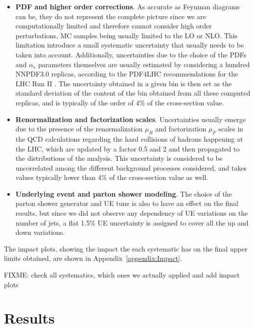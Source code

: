 \documentclass[a4paper, 10pt, openright]{report}
\begin{document}
\begin{itemize}
\item \textbf{PDF and higher order corrections}. As accurate as Feynman diagrams can be, they do not represent the complete picture since we are computationally limited and therefore cannot consider high order perturbations, \ac{MC} samples being usually limited to the \acf{LO} or \acf{NLO}. This limitation introduce a small systematic uncertainty that usually needs to be taken into account. Additionally, uncertainties due to the choice of the \acp{PDF} and $\alpha_s$ parameters themselves are usually estimated by considering a hundred NNPDF3.0 \cite{NNPDF} replicas, according to the PDF4LHC recommendations for the \ac{LHC} Run II \cite{PDF4LHC}. The uncertainty obtained in a given bin is then set as the standard deviation of the content of the bin obtained from all these computed replicas, and is typically of the order of 4\% of the cross-section value.
\item \textbf{Renormalization and factorization scales}. Uncertainties usually emerge due to the presence of the renormalization $\mu_R$ and factorization $\mu_F$ scales in the QCD calculations regarding the hard collisions of hadrons happening at the \ac{LHC}, which are updated by a factor 0.5 and 2 and then propagated to the distributions of the analysis. This uncertainty is considered to be uncorrelated among the different background processes considered, and takes values typically lower than 4\% of the cross-section value as well.
\item \textbf{Underlying event and parton shower modeling}. The choice of the parton shower generator and \ac{UE} tune is also to have an effect on the final results, but since we did not observe any dependency of \ac{UE} variations on the number of jets, a flat 1.5\% \ac{UE} uncertainty is assigned to cover all the up and down variations.
\end{itemize}

The impact plots, showing the impact the each systematic has on the final upper limits obtained, are shown in Appendix~\ref{appendix:Impact}.

\color{red} FIXME: check all systematics, which ones we actually applied and add impact plots \color{black}

\section{Results} \label{section:Results}
\end{document}
